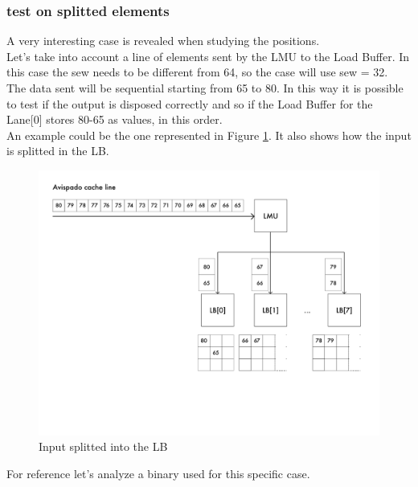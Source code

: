 \subsubsection{test on splitted elements} 
A very interesting case is revealed when studying the positions.\\
Let's take into account a line of elements sent by the LMU to the Load Buffer. In this case the sew needs to be different from 64, so the case will use sew = 32.\\

The data sent will be sequential starting from 65 to 80. In this way it is possible to test if the output is disposed correctly and so if the Load Buffer for the Lane[0] stores 80-65 as values, in this order.\\

An example could be the one represented in Figure \ref{cache-to-lb-split-ex}. It also shows how the input is splitted in the LB.

\begin{figure}[H]
    \centering
    \includegraphics[scale = 0.6]{Chapter_2/img/cache-to-lb-split-ex.png}
    \caption{Input splitted into the LB}
    \label{cache-to-lb-split-ex}
\end{figure}

For reference let's analyze a binary used for this specific case.
\newpage

